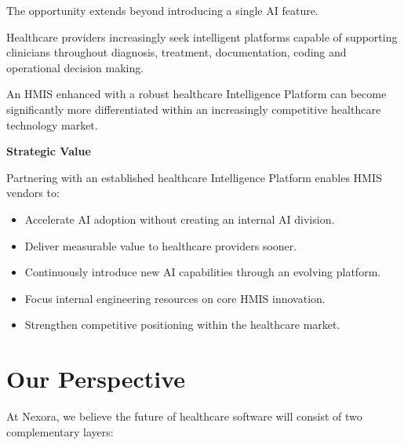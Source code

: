 The opportunity extends beyond introducing a single AI feature.

Healthcare providers increasingly seek intelligent platforms capable of supporting clinicians throughout diagnosis, treatment, documentation, coding and operational decision making.

An HMIS enhanced with a robust healthcare Intelligence Platform can become significantly more differentiated within an increasingly competitive healthcare technology market.


\begin{infobox}

\textbf{Strategic Value}

Partnering with an established healthcare Intelligence Platform enables HMIS vendors to:

\begin{itemize}

\item Accelerate AI adoption without creating an internal AI division.

\item Deliver measurable value to healthcare providers sooner.

\item Continuously introduce new AI capabilities through an evolving platform.

\item Focus internal engineering resources on core HMIS innovation.

\item Strengthen competitive positioning within the healthcare market.

\end{itemize}

\end{infobox}


\section{Our Perspective}

At Nexora, we believe the future of healthcare software will consist of two complementary layers:

\vspace{5mm}

